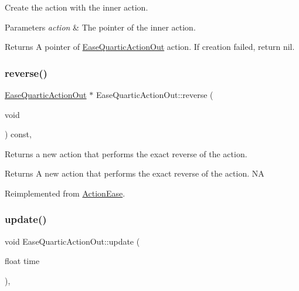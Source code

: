 Create the action with the inner action. 


\begin{DoxyParams}{Parameters}
{\em action} & The pointer of the inner action. \\
\hline
\end{DoxyParams}
\begin{DoxyReturn}{Returns}
A pointer of \hyperlink{classEaseQuarticActionOut}{Ease\+Quartic\+Action\+Out} action. If creation failed, return nil. 
\end{DoxyReturn}
\mbox{\label{classEaseQuarticActionOut_a0826d867637edc85123861ebac4b7a84}} 
\subsubsection{\texorpdfstring{reverse()}{reverse()}}
{\footnotesize\ttfamily \hyperlink{classEaseQuarticActionOut}{Ease\+Quartic\+Action\+Out} $\ast$ Ease\+Quartic\+Action\+Out\+::reverse (\begin{DoxyParamCaption}\item[{void}]{ }\end{DoxyParamCaption}) const\hspace{0.3cm}{\ttfamily [override]}, {\ttfamily [virtual]}}

Returns a new action that performs the exact reverse of the action.

\begin{DoxyReturn}{Returns}
A new action that performs the exact reverse of the action.  NA 
\end{DoxyReturn}


Reimplemented from \hyperlink{classActionEase_ab99eb083fa033fae1d6c948fdc730782}{Action\+Ease}.

\mbox{\label{classEaseQuarticActionOut_a00d0cdbad4cb7d38c9655780f2034a97}} 
\subsubsection{\texorpdfstring{update()}{update()}}
{\footnotesize\ttfamily void Ease\+Quartic\+Action\+Out\+::update (\begin{DoxyParamCaption}\item[{float}]{time }\end{DoxyParamCaption})\hspace{0.3cm}{\ttfamily [override]}, {\ttfamily [virtual]}}

